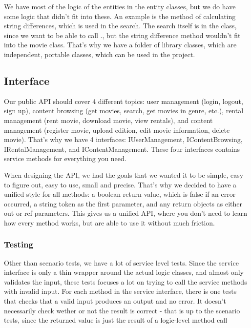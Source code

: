 We have most of the logic of the entities in the entity classes, but we do have some logic that didn't fit into these. An example is the method of calculating string differences, which is used in the search. The search itself is in the  class, since we want to be able to call ., but the string difference method wouldn't fit into the movie class. That's why we have a folder of library classes, which are independent, portable classes, which can be used in the project. 

\subsection{Interface}
\label{Design_Service_Interface}
Our public API should cover 4 different topics: user management (login, logout, sign up), content browsing (get movies, search, get movies in genre, etc.), rental management (rent movie, download movie, view rentals), and content management (register movie, upload edition, edit movie information, delete movie). That's why we have 4 interfaces: IUserManagement, IContentBrowsing, IRentalManagement, and IContentManagement. These four interfaces contains service methods for everything you need.

When designing the API, we had the goals that we wanted it to be simple, easy to figure out, easy to use, small and precise. That's why we decided to have a unified style for all methods: a boolean return value, which is false if an error occurred, a string token as the first parameter, and any return objects as either out or ref parameters. This gives us a unified API, where you don't need to learn how every method works, but are able to use it without much friction.

\subsubsection{Testing}
Other than scenario tests, we have a lot of service level tests. Since the service interface is only a thin wrapper around the actual logic classes, and almost only validates the input, these tests focuses a lot on trying to call the service methods with invalid input. For each method in the service interface, there is one tests that checks that a valid input produces an output and no error. It doesn't necessarily check wether or not the result is correct - that is up to the scenario tests, since the returned value is just the result of a logic-level method call

